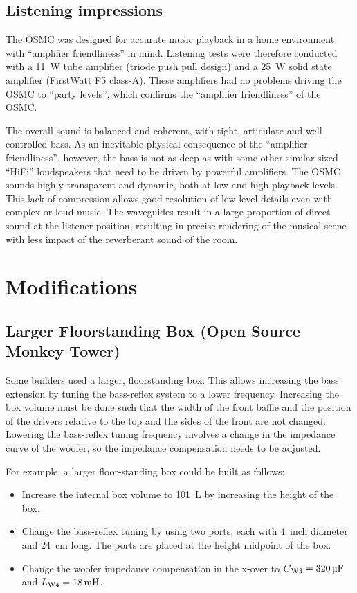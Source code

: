 \documentclass[12pt,a4paper]{article}
\providecommand{\inductor}[1]{L\textsubscript{#1}}
\providecommand{\capacitor}[1]{C\textsubscript{#1}}
\begin{document}
\subsection{Listening impressions}
The OSMC was designed for accurate music playback in a home environment with ``amplifier friendliness'' in mind. Listening tests were therefore conducted with a \SI{11}{W} tube amplifier (triode push pull design) and a \SI{25}{W} solid state amplifier (FirstWatt F5 class-A). These amplifiers had no problems driving the OSMC to ``party levels'', which confirms the ``amplifier friendliness'' of the OSMC.\par

The overall sound is balanced and coherent, with tight, articulate and well controlled bass. As an inevitable physical consequence of the ``amplifier friendliness'', however, the bass is not as deep as with some other similar sized ``HiFi'' loudspeakers that need to be driven by powerful amplifiers. The OSMC sounds highly transparent and dynamic, both at low and high playback levels. This lack of compression allows good resolution of low-level details even with complex or loud music. The waveguides result in a large proportion of direct sound at the listener position, resulting in precise rendering of the musical scene with less impact of the reverberant sound of the room.

\clearpage

\section{Modifications}

\subsection{Larger Floorstanding Box (Open Source Monkey Tower)}
Some builders used a larger, floorstanding box. This allows increasing the bass extension by tuning the bass-reflex system to a lower frequency. Increasing the box volume must be done such that the width of the front baffle and the position of the drivers relative to the top and the sides of the front are not changed. Lowering the bass-reflex tuning frequency involves a change in the impedance curve of the woofer, so the impedance compensation needs to be adjusted.

For example, a larger floor-standing box could be built as follows:\cite{osmt_p144}
\begin{itemize}
\item Increase the internal box volume to \SI{101}{L} by increasing the height of the box.
\item Change the bass-reflex tuning by using two ports, each with \SI{4}{inch} diameter and \SI{24}{cm} long. The ports are placed at the height midpoint of the box.
\item Change the woofer impedance compensation in the x-over to $\capacitor{W3} = \SI{320}{\micro F}$ and $\inductor{W4} = \SI{18}{mH}$.
\end{itemize}


\clearpage



\end{document}

